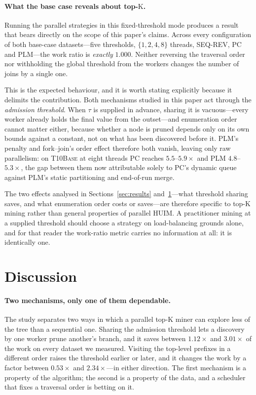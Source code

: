 \documentclass[pdflatex,sn-vancouver-num]{sn-jnl}
\theoremstyle{thmstyleone}%
\theoremstyle{thmstyletwo}%
\theoremstyle{thmstylethree}%
\newcommand{\Kk}{\mathrm{K}}
\begin{document}
\paragraph{What the base case reveals about top-$\Kk$.}
\label{par:minutilworkratio}
Running the parallel strategies in this fixed-threshold mode produces a
result that bears directly on the scope of this paper's claims. Across
every configuration of both base-case datasets---five thresholds,
$\{1,2,4,8\}$ threads, SEQ-REV, PC and PLM---the work ratio is
\emph{exactly} $1.000$. Neither reversing the traversal order nor
withholding the global threshold from the workers changes the number of
joins by a single one.
 
This is the expected behaviour, and it is worth stating explicitly
because it delimits the contribution. Both mechanisms studied in this
paper act through the \emph{admission threshold}. When $\tau$ is supplied
in advance, sharing it is vacuous---every worker already holds the final
value from the outset---and enumeration order cannot matter either,
because whether a node is pruned depends only on its own bounds against
a constant, not on what has been discovered before it. PLM's penalty and
fork--join's order effect therefore both vanish, leaving only raw
parallelism: on \textsc{T10Base} at eight threads PC reaches
$5.5$--$5.9\times$ and PLM $4.8$--$5.3\times$, the gap between them now
attributable solely to PC's dynamic queue against PLM's static
partitioning and end-of-run merge.
 
The two effects analysed in Sections~\ref{sec:results}
and~\ref{sec:discussion}---what threshold sharing saves, and what
enumeration order costs or saves---are therefore specific to top-$\Kk$
mining rather than general properties of parallel HUIM. A practitioner
mining at a supplied threshold should choose a strategy on
load-balancing grounds alone, and for that reader the work-ratio metric
carries no information at all: it is identically one.

\FloatBarrier
\section{Discussion}\label{sec:discussion}
 
\paragraph{Two mechanisms, only one of them dependable.}
The study separates two ways in which a parallel top-$\Kk$ miner can
explore less of the tree than a sequential one. Sharing the admission
threshold lets a discovery by one worker prune another's branch, and it
saves between $1.12\times$ and $3.01\times$ of the work on every dataset
we measured. Visiting the top-level prefixes in a different order raises
the threshold earlier or later, and it changes the work by a factor
between $0.53\times$ and $2.34\times$---in either direction. The first
mechanism is a property of the algorithm; the second is a property of
the data, and a scheduler that fixes a traversal order is betting on it.
 
\end{document}
